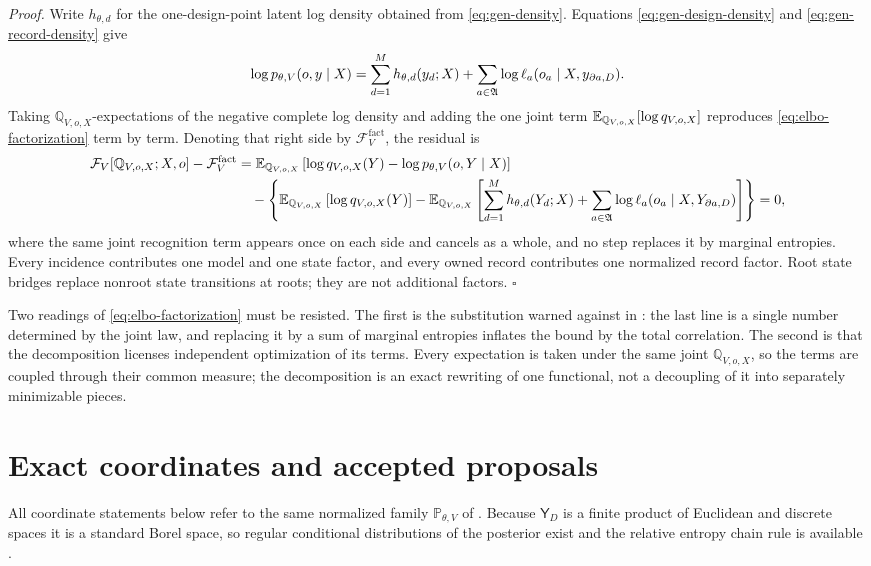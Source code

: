 \emph{Proof.} Write \(h_{\theta,d}\) for the one-design-point latent log density obtained from \eqref{eq:gen-density}. Equations \eqref{eq:gen-design-density} and \eqref{eq:gen-record-density} give
\[
\log p_{\theta,V}(o,y\mid X)
=\sum_{d=1}^{M}h_{\theta,d}(y_d;X)
+\sum_{a\in\mathfrak A}
\log\ell_a(o_a\mid X,y_{\partial a,D}).
\]
Taking \(\mathbb Q_{V,o,X}\)-expectations of the negative complete log density and adding the one joint term \(\mathbb E_{\mathbb Q_{V,o,X}}[\log q_{V,o,X}]\) reproduces \eqref{eq:elbo-factorization} term by term. Denoting that right side by \(\mathcal F_V^{\mathrm{fact}}\), the residual is
\begin{align}
\mathcal F_V[\mathbb Q_{V,o,X};X,o]-\mathcal F_V^{\mathrm{fact}}
&=\mathbb E_{\mathbb Q_{V,o,X}}\left[
\log q_{V,o,X}(Y)-\log p_{\theta,V}(o,Y\mid X)
\right]\notag\\
&\quad-\left\{
\mathbb E_{\mathbb Q_{V,o,X}}\left[\log q_{V,o,X}(Y)\right]
-\mathbb E_{\mathbb Q_{V,o,X}}\left[
\sum_{d=1}^{M}h_{\theta,d}(Y_d;X)
+\sum_{a\in\mathfrak A}\log\ell_a(o_a\mid X,Y_{\partial a,D})
\right]
\right\}
=0,
\label{eq:elbo-audit}
\end{align}
where the same joint recognition term appears once on each side and cancels as a whole, and no step replaces it by marginal entropies. Every incidence contributes one model and one state factor, and every owned record contributes one normalized record factor. Root state bridges replace nonroot state transitions at roots; they are not additional factors. \hfill\(\square\)

Two readings of \eqref{eq:elbo-factorization} must be resisted. The first is the substitution warned against in : the last line is a single number determined by the joint law, and replacing it by a sum of marginal entropies inflates the bound by the total correlation. The second is that the decomposition licenses independent optimization of its terms. Every expectation is taken under the same joint \(\mathbb Q_{V,o,X}\), so the terms are coupled through their common measure; the decomposition is an exact rewriting of one functional, not a decoupling of it into separately minimizable pieces.

\section{Exact coordinates and accepted proposals}
\label{sec:elbo-coordinates}

All coordinate statements below refer to the same normalized family \(\mathbb P_{\theta,V}\) of . Because \(\mathsf Y_D\) is a finite product of Euclidean and discrete spaces it is a standard Borel space, so regular conditional distributions of the posterior exist and the relative entropy chain rule is available \citep{Klenke2020}.

